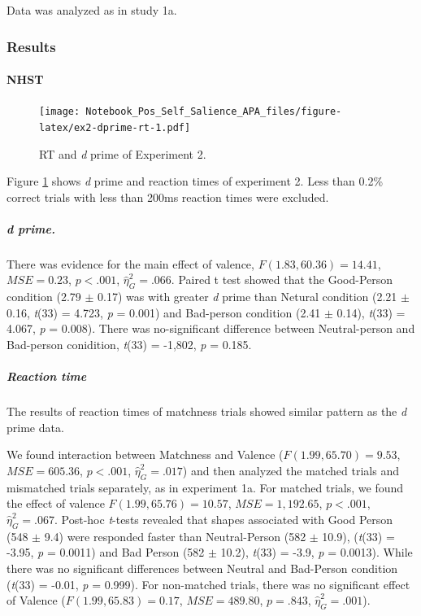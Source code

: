 \documentclass[
  english,
  man]{apa6}
\let\oldparagraph\paragraph
\renewcommand{\paragraph}[1]{\oldparagraph{#1}\mbox{}}
\let\oldsubparagraph\subparagraph
\renewcommand{\subparagraph}[1]{\oldsubparagraph{#1}\mbox{}}
\begin{document}
Data was analyzed as in study 1a.

\hypertarget{results-3}{%
\subsubsection{Results}\label{results-3}}

\hypertarget{nhst-1}{%
\paragraph{NHST}\label{nhst-1}}

\begin{figure}
\centering
\texttt{[image: Notebook\_Pos\_Self\_Salience\_APA\_files/figure-latex/ex2-dprime-rt-1.pdf]}
\caption{\label{fig:ex2-dprime-rt}RT and \emph{d} prime of Experiment 2.}
\end{figure}

Figure \ref{fig:ex2-dprime-rt} shows \emph{d} prime and reaction times of experiment 2. Less than 0.2\% correct trials with less than 200ms reaction times were excluded.

\hypertarget{d-prime.}{%
\subparagraph{d prime.}\label{d-prime.}}

There was evidence for the main effect of valence, \(F(1.83, 60.36) = 14.41\), \(\mathit{MSE} = 0.23\), \(p < .001\), \(\hat{\eta}^2_G = .066\). Paired t test showed that the Good-Person condition (2.79 \(\pm\) 0.17) was with greater \emph{d} prime than Netural condition (2.21 \(\pm\) 0.16, \emph{t}(33) = 4.723, \emph{p} = 0.001) and Bad-person condition (2.41 \(\pm\) 0.14), \emph{t}(33) = 4.067, \emph{p} = 0.008). There was no-significant difference between Neutral-person and Bad-person conidition, \emph{t}(33) = -1,802, \emph{p} = 0.185.

\hypertarget{reaction-time-3}{%
\subparagraph{Reaction time}\label{reaction-time-3}}

The results of reaction times of matchness trials showed similar pattern as the \emph{d} prime data.

We found interaction between Matchness and Valence (\(F(1.99, 65.70) = 9.53\), \(\mathit{MSE} = 605.36\), \(p < .001\), \(\hat{\eta}^2_G = .017\)) and then analyzed the matched trials and mismatched trials separately, as in experiment 1a. For matched trials, we found the effect of valence \(F(1.99, 65.76) = 10.57\), \(\mathit{MSE} = 1,192.65\), \(p < .001\), \(\hat{\eta}^2_G = .067\). Post-hoc \emph{t}-tests revealed that shapes associated with Good Person (548 \(\pm\) 9.4) were responded faster than Neutral-Person (582 \(\pm\) 10.9), (\emph{t}(33) = -3.95, \emph{p} = 0.0011) and Bad Person (582 \(\pm\) 10.2), \emph{t}(33) = -3.9, \emph{p} = 0.0013). While there was no significant differences between Neutral and Bad-Person condition (\emph{t}(33) = -0.01, \emph{p} = 0.999). For non-matched trials, there was no significant effect of Valence (\(F(1.99, 65.83) = 0.17\), \(\mathit{MSE} = 489.80\), \(p = .843\), \(\hat{\eta}^2_G = .001\)).
\end{document}
